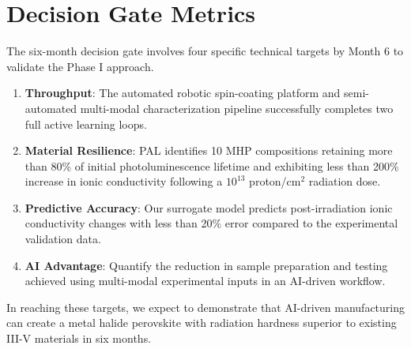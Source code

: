 \documentclass[pgs]{DOE}
\newcommand{\mnote}[1]{{\marginpar{\color{red} #1}}}
\newcommand{\todo}[2]{{[\color{RawSienna} #1] \color{red} #2}}
\renewcommand{\mnote}[1]{}
\renewcommand{\todo}[2]{}
\begin{document}

\section{Decision Gate Metrics}
\mnote{0.5 page}
%
%
% 
%


The six-month decision gate involves four specific technical targets by Month 6 to validate the Phase I approach.

\begin{enumerate}

    \item \textbf{Throughput}: The automated robotic spin-coating platform and semi-automated multi-modal characterization pipeline successfully completes two full active learning loops. 

    \item \textbf{Material Resilience}: PAL identifies 10 MHP compositions retaining more than 80\% of initial photoluminescence lifetime and exhibiting less than 200\% increase in ionic conductivity following a $10^{13}$ proton/cm$^2$ radiation dose.

    \item \textbf{Predictive Accuracy}: Our surrogate model predicts post-irradiation ionic conductivity changes with less than 20\% error compared to the experimental validation data.

    \item \textbf{AI Advantage}: Quantify the reduction in sample preparation and testing achieved using multi-modal experimental inputs in an AI-driven workflow. 

\end{enumerate}

\noindent
In reaching these targets, we expect to demonstrate that AI-driven manufacturing can create a metal halide perovskite with radiation hardness superior to existing III-V materials in six months.
\end{document}
